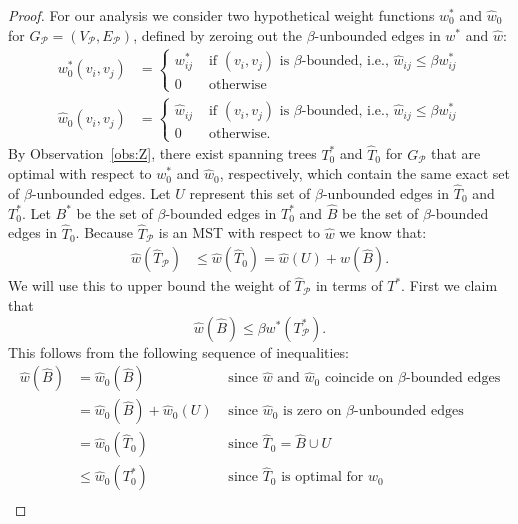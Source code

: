 \begin{proof}
	For our analysis we consider two hypothetical weight functions $w^*_0$ and $\hat{w}_0$ for $G_\mathcal{P} = (V_\mathcal{P}, E_\mathcal{P})$, defined by zeroing out the $\beta$-unbounded edges in $w^*$ and $\hat{w}$:
	\begin{align*}
		w^*_0(v_i, v_j) &= \begin{cases} 
			w^*_{ij} & \text{ if $(v_i,v_j)$ is $\beta$-bounded, i.e., $\hat{w}_{ij} \leq \beta w^*_{ij}$} \\
			0 & \text{ otherwise} 
		\end{cases}\\
		\hat{w}_0(v_i, v_j) &= \begin{cases} 
			\hat{w}_{ij} & \text{ if $(v_i,v_j)$ is $\beta$-bounded, i.e., $\hat{w}_{ij} \leq \beta w^*_{ij}$} \\
			0 & \text{ otherwise}. 
		\end{cases}
	\end{align*}
	By Observation~\ref{obs:Z}, there exist spanning trees $T_0^*$ and $\hat{T}_0$ for $G_\mathcal{P}$ that are optimal with respect to $w_0^*$ and $\hat{w}_0$, respectively, which contain the same exact set of $\beta$-unbounded edges. Let $U$ represent this set of $\beta$-unbounded edges in $\hat{T}_0$ and $T^*_0$. Let $B^*$ be the set of $\beta$-bounded edges in $T^*_0$ and $\hat{B}$ be the set of $\beta$-bounded edges in $\hat{T}_0$. Because $\hat{T}_\mathcal{P}$ is an MST with respect to $\hat{w}$ we know that:
	\begin{align}
		\label{eq:hats}
		\hat{w}(\hat{T}_\mathcal{P}) &\leq \hat{w}(\hat{T}_0) = \hat{w}(U) + \hat{w}(\hat{B}).
	\end{align}
	We will use this to upper bound the weight of $\hat{T}_\mathcal{P}$ in terms of $T^*$. First we claim that
	\begin{equation}
		\label{eq:Lhatbound}
		\hat{w}(\hat{B}) \leq \beta w^*(T_\mathcal{P}^*).
	\end{equation}
	This follows from the following sequence of inequalities:
	\begin{align*}
		\hat{w}(\hat{B}) 
		&= \hat{w}_0(\hat{B}) & \text{ since $\hat{w}$ and $\hat{w}_0$ coincide on $\beta$-bounded edges} \\
		&= \hat{w}_0(\hat{B}) + \hat{w}_0(U) & \text{ since $\hat{w}_0$ is zero on $\beta$-unbounded edges} \\
		&= \hat{w}_0(\hat{T}_0)  & \text{ since $\hat{T}_0 = \hat{B} \cup U$} \\
		& \leq \hat{w}_0(T_0^*) & \text{ since $\hat{T}_0$ is optimal for $\hat{w}_0$} \\

\end{align*}
\end{proof}
